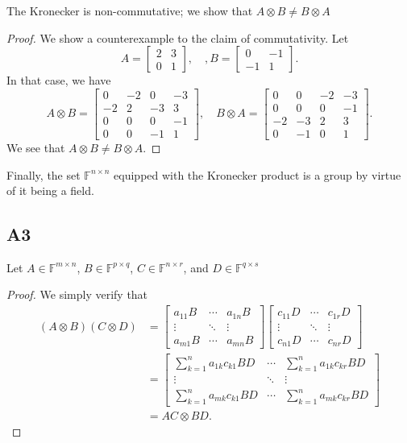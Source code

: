 \documentclass[11pt]{article}
\newcommand{\field}{\mathbb{F}} %
\newcommand{\kp}{\otimes} %
\begin{document}
The Kronecker is non-commutative; we show that \(A \kp B \neq B \kp A\)

\begin{proof}
We show a counterexample to the claim of commutativity.
Let
\[
A = \begin{bmatrix}
2 & 3 \\ 0 & 1
\end{bmatrix}, \quad, B = \begin{bmatrix}
0 & -1 \\ -1 & 1
\end{bmatrix}.
\]
In that case, we have
\[
A \kp B = \begin{bmatrix}
0 & -2 & 0 & -3 \\
-2 & 2 & -3 & 3 \\
0 & 0 & 0 & -1 \\
0 & 0 & -1 & 1
\end{bmatrix}, \quad B \kp A = \begin{bmatrix}
0 & 0 & -2 & -3 \\
0 & 0 & 0 & -1 \\
-2 & -3 & 2 & 3 \\
0 & -1 & 0 & 1
\end{bmatrix}.
\]
We see that \(A \kp B \neq B \kp A\).
\end{proof}

Finally, the set \(\field^{n \times n}\) equipped with the Kronecker product is a group by virtue of it being a field. %

\subsection*{A3}
Let \(A \in \field^{m \times n}\), \(B \in \field^{p \times q}\), \(C \in \field^{n \times r}\), and \(D \in \field^{q \times s}\)
\begin{proof}
We simply verify that
\begin{align*}
(A \kp B) (C \kp D) &= \begin{bmatrix}
a_{11} B & \cdots & a_{1n}B \\
\vdots & \ddots & \vdots \\
a_{m1} B & \cdots & a_{mn} B
\end{bmatrix} \begin{bmatrix}
c_{11} D & \cdots & c_{1r} D \\
\vdots & \ddots & \vdots \\
c_{n1} D & \cdots & c_{nr} D
\end{bmatrix}\\
&= \begin{bmatrix}
\sum_{k=1}^n a_{1k} c_{k1} BD & \cdots & \sum_{k=1}^n a_{1k} c_{kr} BD \\
\vdots & \ddots & \vdots \\
\sum_{k=1}^n a_{mk} c_{k1} BD & \cdots & \sum_{k=1}^n a_{mk} c_{kr} BD
\end{bmatrix}\\
&= AC \kp BD.
\end{align*}
\end{proof}
\end{document}
